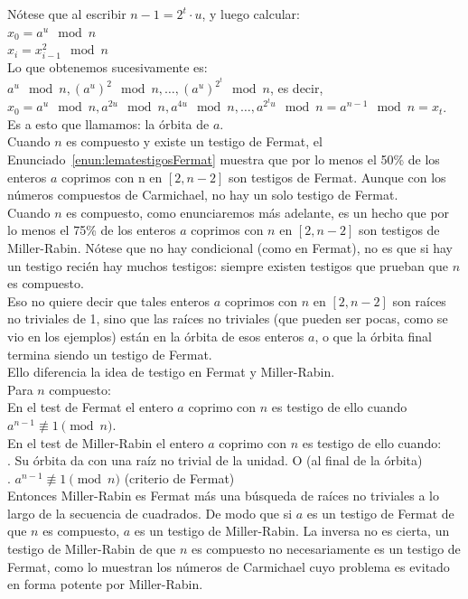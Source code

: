 Nótese que al escribir $n-1 = 2^t \cdot u$, y luego calcular: \\
$x_0 = a^{u} \mod n$ \\
$x_i = x_{i-1}^2 \mod n$ \\
Lo que obtenemos sucesivamente es: \\
$a^{u} \mod n, (a^{u})^2 \mod n, \ldots, (a^{u})^{2^t} \mod n$, es decir,\\
$x_0 = a^{u} \mod n, a^{2u} \mod n, a^{4u} \mod n, \ldots, a^{2^tu} \mod n = a^{n-1} \mod n = x_t$. \\ Es a esto que llamamos: la órbita de $a$. \\

Cuando $n$ es compuesto y existe un testigo de Fermat, el Enunciado~\ref{enun:lematestigosFermat} muestra que por lo menos el 50\% de los enteros $a$ coprimos con n en $[2, n-2]$ son testigos de Fermat. Aunque con los números compuestos de Carmichael, no hay un solo testigo de Fermat. \\
Cuando $n$ es compuesto, como enunciaremos más adelante, es un hecho que por lo menos el 75\% de los enteros $a$ coprimos con $n$ en $[2, n-2]$ son testigos de Miller-Rabin. Nótese que no hay condicional (como en Fermat), no es que si hay un testigo recién hay muchos testigos: siempre existen testigos que prueban que $n$ es compuesto. \\
Eso no quiere decir que tales enteros $a$ coprimos con $n$ en $[2, n-2]$ son raíces no triviales de 1, sino que las raíces no triviales (que pueden ser pocas, como se vio en los ejemplos) están en la órbita de esos enteros $a$, o que la órbita final termina siendo un testigo de Fermat. \\

Ello diferencia la idea de testigo en Fermat y Miller-Rabin. \\
Para $n$ compuesto: \\
En el test de Fermat el entero $a$ coprimo con $n$ es testigo de ello cuando $a^{n-1} \not\equiv 1 \pmod n$. \\
En el test de Miller-Rabin el entero $a$ coprimo con $n$ es testigo de ello cuando: \\
. Su órbita da con una raíz no trivial de la unidad. O (al final de la órbita)\\
. $a^{n-1} \not\equiv 1 \pmod n$ \quad (criterio de Fermat) \\
Entonces Miller-Rabin es Fermat más una búsqueda de raíces no triviales a lo largo de la secuencia de cuadrados. 
De modo que si $a$ es un testigo de Fermat de que $n$ es compuesto, $a$ es un testigo de Miller-Rabin.
La inversa no es cierta, un testigo de Miller-Rabin de que $n$ es compuesto no necesariamente es un testigo de Fermat, como lo muestran los números de Carmichael cuyo problema es evitado en forma potente por Miller-Rabin.

